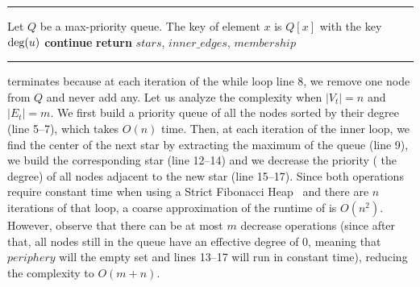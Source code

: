 \begin{center}
  \rule{\textwidth}{.3pt}
  \begin{algorithmic}[1]
      \State Let $Q$ be a max-priority queue. The key of element $x$ is $Q[x]$
        \State {} \Comment with the key $\operatorname{deg}(u)$
      \EndFor
          \State \textbf{continue} 
        \EndIf
            \State {}
          \EndFor
        \EndFor
      \EndWhile
      \State \textbf{return} $stars$, $inner\_edges$, $membership$%
    \EndFunction
  \end{algorithmic}
  \rule{\textwidth}{.3pt}
\end{center}

\extractStar{} terminates because at each iteration of the while loop line 8, we remove one node
from $Q$ and never add any. Let us analyze the complexity when $|V_t|=n$ and $|E_t|=m$. We first
build a priority queue of all the nodes sorted by their degree (line 5--7), which takes $O(n)$ time.
Then, at each iteration of the inner loop, we find the center of the next star by extracting the
maximum of the queue (line 9), we build the corresponding star (line 12--14) and we decrease the
priority (\ie{} the degree) of all nodes adjacent to the new star (line 15--17).  Since both
operations require constant time when using a Strict Fibonacci Heap~\autocite{FibonacciHeaps12} and
there are $n$ iterations of that loop, a coarse approximation of the runtime of \extractStar{} is
$O(n^2)$. However, observe that there can be at most $m$ decrease operations (since after that, all
nodes still in the queue have an effective degree of $0$, meaning that $periphery$ will the empty
set and lines 13--17 will run in constant time), reducing the complexity to $O(m+n)$.

